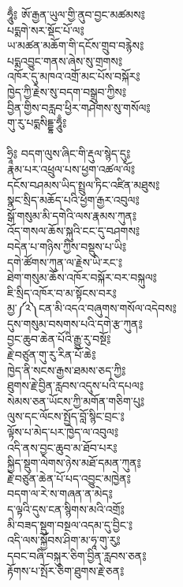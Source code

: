 {\ti ཧཱུྃ༔ ཨོ་རྒྱན་ཡུལ་གྱི་ནུབ་བྱང་མཚམས༔\\
པདྨགེ་སར་སྡོང་པོ་ལ༔\\
ཡ་མཚན་མཆོག་གི་དངོས་གྲུབ་བརྙེས༔\\
པདྨའབྱུང་གནས་ཞེས་སུ་གྲགས༔\\
འཁོར་དུ་མཁའ་འགྲོ་མང་པོས་བསྐོར༔\\
ཁྱེད་ཀྱི་རྗེས་སུ་བདག་བསྒྲུབ་ཀྱིས༔\\
བྱིན་གྱིས་བརླབ་ཕྱིར་གཤེགས་སུ་གསོལ༔\\
གུ་རུ་པདྨསིདྡྷ་ཧཱུྃ༔\\
\\
ཧྲཱི༔ བདག་ལུས་ཞིང་གི་རྡུལ་སྙེད་དུ༔\\
རྣམ་པར་འཕྲུལ་པས་ཕྱག་འཚལ་ལོ༔\\
དངོས་བཤམས་ཡིད་སྤྲུལ་ཏིང་འཛིན་མཐུས༔\\
སྣང་སྲིད་མཆོད་པའི་ཕྱག་རྒྱར་འབུལ༔\\
སྒོ་གསུམ་མི་དགེའི་ལས་རྣམས་ཀུན༔\\
འོད་གསལ་ཆོས་སྐུའི་ངང་དུ་བཤགས༔\\
བདེན་པ་གཉིས་ཀྱིས་བསྡུས་པ་ཡི༔\\
དགེ་ཚོགས་ཀུན་ལ་རྗེས་ཡི་རང་༔\\
ཐེག་གསུམ་ཆོས་འཁོར་བསྐོར་བར་བསྐུལ༔\\
ཇི་སྲིད་འཁོར་བ་མ་སྟོངས་བར༔\\
མྱ་༼༢༽ངན་མི་འདའ་བཞུགས་གསོལ་འདེབས༔\\
དུས་གསུམ་བསགས་པའི་དགེ་རྩ་ཀུན༔\\
བྱང་ཆུབ་ཆེན་པོའི་རྒྱུ་རུ་བསྔོ༔\\
རྗེ་བཙུན་གུ་རུ་རིན་པོ་ཆེ༔\\
ཁྱེད་ནི་སངས་རྒྱས་ཐམས་ཅད་ཀྱི༔\\
ཐུགས་རྗེ་བྱིན་རླབས་འདུས་པའི་དཔལ༔\\
སེམས་ཅན་ཡོངས་ཀྱི་མགོན་གཅིག་པུ༔\\
ལུས་དང་ལོངས་སྤྱོད་བློ་སྙིང་བྲང་༔\\
ལྟོས་པ་མེད་པར་ཁྱེད་ལ་འབུལ༔\\
འདི་ནས་བྱང་ཆུབ་མ་ཐོབ་པར༔\\
སྐྱིད་སྡུག་ལེགས་ཉེས་མཐོ་དམན་ཀུན༔\\
རྗེ་བཙུན་ཆེན་པོ་པད་འབྱུང་མཁྱེན༔\\
བདག་ལ་རེ་ས་གཞན་ན་མེད༔\\
ད་ལྟའི་དུས་ངན་སྙིགས་མའི་འགྲོ༔\\
མི་བཟད་སྡུག་བསྔལ་འདམ་དུ་བྱིང་༔\\
འདི་ལས་སྐྱོབས་ཤིག་མ་ཧཱ་གུ་རུ༔\\
དབང་བཞི་བསྐུར་ཅིག་བྱིན་རླབས་ཅན༔\\
རྟོགས་པ་སྤོར་ཅིག་ཐུགས་རྗེ་ཅན༔\\
}
